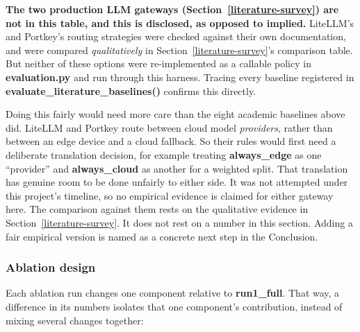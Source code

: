 \textbf{The two production LLM gateways (Section~\ref{literature-survey}) are not in this
table, and this is disclosed, as opposed to implied.} LiteLLM's and
Portkey's routing strategies were checked against their own
documentation, and were compared \emph{qualitatively} in Section~\ref{literature-survey}'s
comparison table. But neither of these options were re-implemented as a callable policy
in \textbf{evaluation.py} and run through this harness. Tracing every
baseline registered in \textbf{evaluate\_literature\_baselines()}
confirms this directly.

Doing this fairly would need more care than the eight academic
baselines above did. LiteLLM and Portkey route between cloud model
\emph{providers}, rather than between an edge device and a cloud fallback. So
their rules would first need a deliberate translation decision, for
example treating \textbf{always\_edge} as one ``provider'' and
\textbf{always\_cloud} as another for a weighted split. That
translation has genuine room to be done unfairly to either side. It
was not attempted under this project's timeline, so no empirical evidence
is claimed for either gateway here. The comparison against them rests
on the qualitative evidence in Section~\ref{literature-survey}. It does not rest on a
number in this section. Adding a fair empirical version is named as a concrete next
step in the Conclusion.

\hypertarget{ablation-design}{%
\subsubsection{Ablation design}\label{ablation-design}}

Each ablation run changes one component relative to
\textbf{run1\_full}. That way, a difference in its numbers isolates
that one component's contribution, instead of mixing several changes
together:

